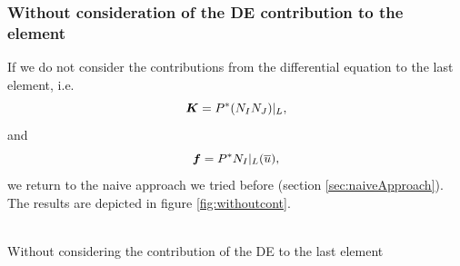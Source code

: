 \documentclass[a4paper,12pt]{article}
\makeatletter
\newcommand{\mb}[1]{{\mbox{\boldmath$#1$\unboldmath}}}
\newenvironment{figurehere}
  {\def\@captype{figure}}
  {}
\makeatother
\begin{document}
\subsubsection{Without consideration of the DE contribution to the element}
If we do not consider the contributions from the differential equation to the last element, i.e.
\begin{equation*}
\mb{K} =  P^*(N_I N_J)\vert_{L},
\end{equation*}
and
\begin{equation*}
\mb{f} = P^*N_I\vert_{L}(\overline{u}),
\end{equation*}
we return to the naive approach we tried before (section \ref{sec:naiveApproach}).
The results are depicted in figure \ref{fig:withoutcont}.
\begin{center}
\begin{figurehere} 
\\
\caption{Without considering the contribution of the DE to the last element}\label{fig:withoutcont}
\end{figurehere}
\end{center}
\end{document}
